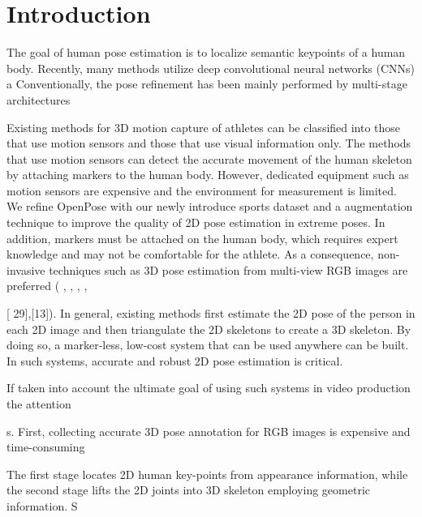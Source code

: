\setcounter{chapter}{0}

\chapter{Introduction}

The goal of human pose estimation is to localize semantic keypoints of a human body. 
Recently, many methods utilize deep convolutional neural networks (CNNs) a
Conventionally, the pose refinement has been mainly performed by multi-stage architectures 


Existing methods for 3D motion capture of athletes can
be classified into those that use motion sensors and those
that use visual information only. The methods that use motion sensors can detect the accurate movement of the human
skeleton by attaching markers to the human body. However, dedicated equipment such as motion sensors are expensive and the environment for measurement is limited.
 We refine OpenPose with our newly introduce sports
dataset and a augmentation technique to improve the quality of
2D pose estimation in extreme poses.
In addition, markers must be attached on the human body,
which requires expert knowledge and may not be comfortable for the athlete. As a consequence, non-invasive techniques such as 3D pose estimation from multi-view RGB
images are preferred ( \cite{DBLP:journals/corr/abs-1907-11346}, \cite{DBLP:journals/corr/abs-1904-01324} , 
\cite{Xu_2020_CVPR}, \cite{DBLP:journals/corr/abs-2003-00529}, \cite{DBLP:journals/corr/abs-2006-07778}

[ 29],[13]). In general,
existing methods first estimate the 2D pose of the person
in each 2D image and then triangulate the 2D skeletons to
create a 3D skeleton. By doing so, a marker-less, low-cost
system that can be used anywhere can be built. In such systems, accurate and robust 2D pose estimation is critical.

If taken into account the ultimate goal of using such systems in video production the attention 

s. First, collecting accurate 3D pose annotation for RGB
images is expensive and time-consuming

The first
stage locates 2D human key-points from appearance information, while the second stage lifts the 2D joints into 3D
skeleton employing geometric information. S